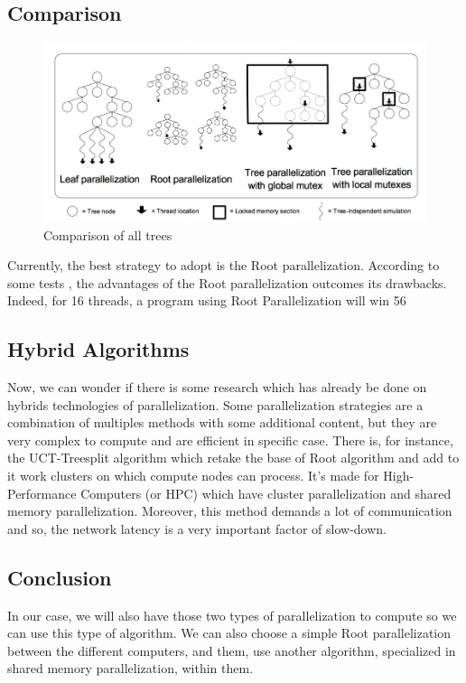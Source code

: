\subsection{Comparison}
\begin{figure}[!h] 
\centerline{\includegraphics[scale=0.60]{2_State_of_the_art/Strategy_of_root_parallelization_Mikail/impara.png}}
   \caption{\label{étiquette} Comparison of all trees}
\end{figure}

Currently, the best strategy to adopt is the Root parallelization. According to some tests \cite{L2}, the advantages of the Root parallelization outcomes its drawbacks. Indeed, for 16 threads, a program using Root Parallelization will win 56%

\subsection{Hybrid Algorithms}

Now, we can wonder if there is some research which has already be done on hybrids technologies of parallelization. Some parallelization strategies are a combination of multiples methods with some additional content, but they are very complex to compute and are efficient in specific case.  There is, for instance, the UCT-Treesplit algorithm which retake the base of Root algorithm and add to it work clusters on which compute nodes can process. It’s made for High-Performance Computers (or HPC) which have cluster parallelization and shared memory parallelization. Moreover, this method demands a lot of communication and so, the network latency is a very important factor of slow-down. 

\subsection{Conclusion}

In our case, we will also have those two types of parallelization to compute so we can use this type of algorithm. We can also choose a simple Root parallelization between the different computers, and them, use another algorithm, specialized in shared memory parallelization, within them. 
